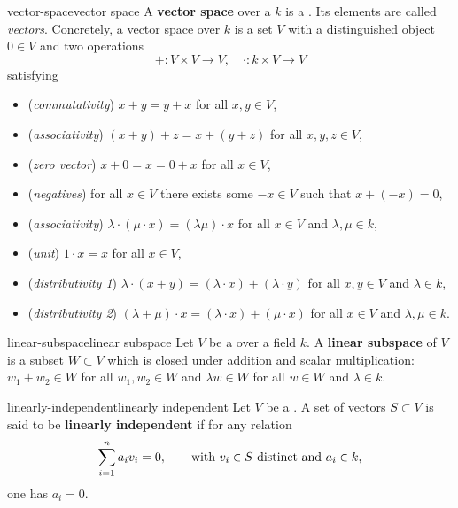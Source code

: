 \begin{topic}{vector-space}{vector space}
    A \textbf{vector space} over a  $k$ is a . Its elements are called \textit{vectors}.
    Concretely, a vector space over $k$ is a set $V$ with a distinguished object $0 \in V$ and two operations
    \[ + : V \times V \to V, \quad \cdot : k \times V \to V \]
    satisfying
    \begin{itemize}
        \item (\textit{commutativity}) $x + y = y + x$ for all $x, y \in V$,
        \item (\textit{associativity}) $(x + y) + z = x + (y + z)$ for all $x, y, z \in V$,
        \item (\textit{zero vector}) $x + 0 = x = 0 + x$ for all $x \in V$,
        \item (\textit{negatives}) for all $x \in V$ there exists some $-x \in V$ such that $x + (-x) = 0$,
        \item (\textit{associativity}) $\lambda \cdot (\mu \cdot x) = (\lambda \mu) \cdot x$ for all $x \in V$ and $\lambda, \mu \in k$,
        \item (\textit{unit}) $1 \cdot x = x$ for all $x \in V$,
        \item (\textit{distributivity 1}) $\lambda \cdot (x + y) = (\lambda \cdot x) + (\lambda \cdot y)$ for all $x, y \in V$ and $\lambda \in k$,
        \item (\textit{distributivity 2}) $(\lambda + \mu) \cdot x = (\lambda \cdot x) + (\mu \cdot x)$ for all $x \in V$ and $\lambda, \mu \in k$.
    \end{itemize}
\end{topic}

\begin{topic}{linear-subspace}{linear subspace}
    Let $V$ be a  over a field $k$. A \textbf{linear subspace} of $V$ is a subset $W \subset V$ which is closed under addition and scalar multiplication: $w_1 + w_2 \in W$ for all $w_1, w_2 \in W$ and $\lambda w \in W$ for all $w \in W$ and $\lambda \in k$.
\end{topic}

\begin{topic}{linearly-independent}{linearly independent}
    Let $V$ be a . A set of vectors $S \subset V$ is said to be \textbf{linearly independent} if for any relation
    \[ \sum_{i = 1}^{n} a_i v_i = 0, \qquad \textup{with $v_i \in S$ distinct and $a_i \in k$,} \]
    one has $a_i = 0$.
\end{topic}

